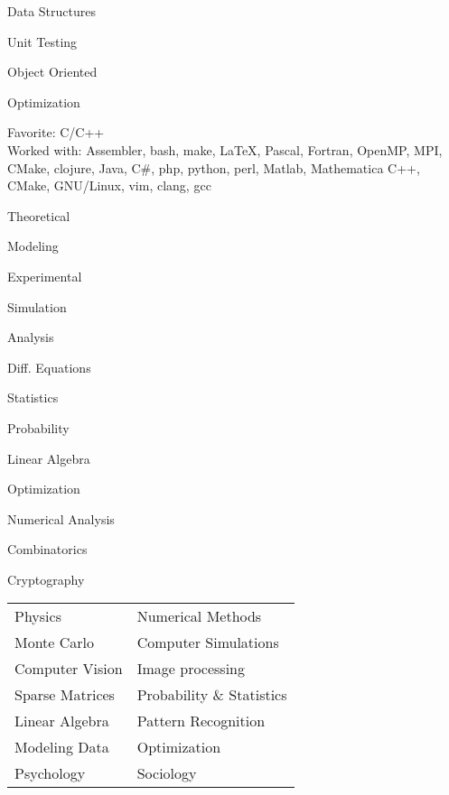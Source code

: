 {
\item Data Structures
\item Unit Testing
\item Object Oriented 
\item Optimization
}
\vspace{-0.8cm}
Favorite: C/C++\\
Worked with: Assembler, bash, make, \LaTeX, Pascal, Fortran, OpenMP, MPI, CMake, clojure, Java, C\#, php, python, perl, Matlab, Mathematica
\vspace{-0.4cm}
C++, CMake, GNU/Linux, vim, clang, gcc
\vspace{-0.2cm}
{
\item Theoretical
\item Modeling
}
{
\item Experimental
\item Simulation
}
\vspace{-0.8cm}
{
\item Analysis 
\item Diff. Equations 
\item Statistics 
\item Probability 
\item Linear Algebra 
}
{
\item Optimization 
\item Numerical Analysis
\item Combinatorics
\item Cryptography
}
\vspace{-0.8cm}
\begin{tabular}{ l l}
Physics             & Numerical Methods         \\
Monte Carlo         & Computer Simulations     \\ 
Computer Vision     & Image processing          \\
Sparse Matrices     & Probability \& Statistics \\
Linear Algebra      & Pattern Recognition      \\   
Modeling Data       & Optimization              \\
Psychology          & Sociology \\
\end{tabular}\\
